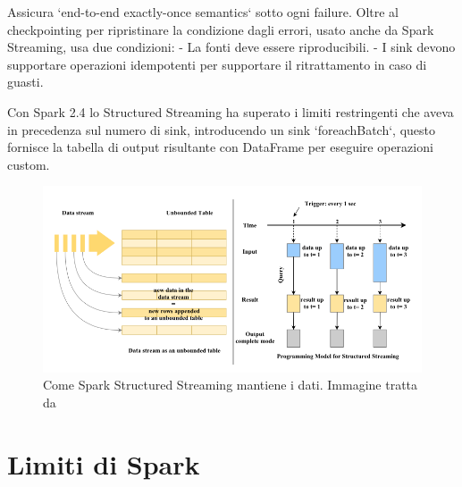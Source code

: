 \documentclass[12pt,italian]{article}
\begin{document}
Assicura `end-to-end exactly-once semantics` sotto ogni failure.
Oltre al checkpointing per ripristinare la condizione dagli errori, usato anche da Spark Streaming, usa due condizioni:
- La fonti deve essere riproducibili.
- I sink devono supportare operazioni idempotenti per supportare il ritrattamento in caso di guasti.

Con Spark 2.4 lo Structured Streaming ha superato i limiti restringenti che aveva in precedenza sul numero di sink, introducendo un sink `foreachBatch`, questo fornisce la tabella di output risultante
con DataFrame per eseguire operazioni custom.
\begin{figure}
	\centering 
	\includegraphics[width=0.8\linewidth]{img/sparkStructuredStreaming.png}
	\caption{Come Spark Structured Streaming mantiene i dati. Immagine tratta da \cite{structuredStreaming}}
	\label{fig:StructuredStreaming}
\end{figure}
\section{Limiti di Spark}
\newpage
\printbibliography
\end{document}

